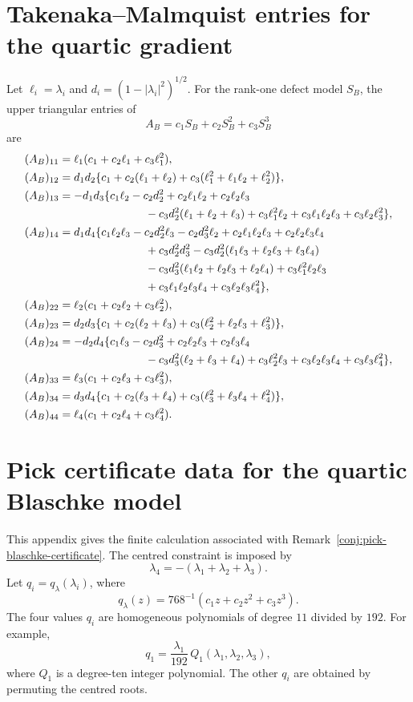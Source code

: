 \documentclass[11pt]{article}
\numberwithin{equation}{section}
\begin{document}
\section{Takenaka--Malmquist entries for the quartic gradient}\label{app:tm-entries}
Let \(\ell_i=\lambda_i\) and \(d_i=(1-|\lambda_i|^2)^{1/2}\).  For the
rank-one defect model \(S_B\), the upper triangular entries of
\[
  A_B=c_1S_B+c_2S_B^2+c_3S_B^3
\]
are
\[
\begin{aligned}
(A_B)_{11}&=\ell_1(c_1+c_2\ell_1+c_3\ell_1^2),\\
(A_B)_{12}&=d_1d_2\{c_1+c_2(\ell_1+\ell_2)
  +c_3(\ell_1^2+\ell_1\ell_2+\ell_2^2)\},\\
(A_B)_{13}&=-d_1d_3\{c_1\ell_2-c_2d_2^2+c_2\ell_1\ell_2+c_2\ell_2\ell_3\\
&\hspace{2.7cm}
-c_3d_2^2(\ell_1+\ell_2+\ell_3)
+c_3\ell_1^2\ell_2+c_3\ell_1\ell_2\ell_3+c_3\ell_2\ell_3^2\},\\
(A_B)_{14}&=d_1d_4\{c_1\ell_2\ell_3-c_2d_2^2\ell_3-c_2d_3^2\ell_2
+c_2\ell_1\ell_2\ell_3+c_2\ell_2\ell_3\ell_4\\
&\hspace{2.7cm}
+c_3d_2^2d_3^2-c_3d_2^2(\ell_1\ell_3+\ell_2\ell_3+\ell_3\ell_4)\\
&\hspace{2.7cm}
-c_3d_3^2(\ell_1\ell_2+\ell_2\ell_3+\ell_2\ell_4)
+c_3\ell_1^2\ell_2\ell_3\\
&\hspace{2.7cm}
+c_3\ell_1\ell_2\ell_3\ell_4+c_3\ell_2\ell_3\ell_4^2\},\\
(A_B)_{22}&=\ell_2(c_1+c_2\ell_2+c_3\ell_2^2),\\
(A_B)_{23}&=d_2d_3\{c_1+c_2(\ell_2+\ell_3)
  +c_3(\ell_2^2+\ell_2\ell_3+\ell_3^2)\},\\
(A_B)_{24}&=-d_2d_4\{c_1\ell_3-c_2d_3^2+c_2\ell_2\ell_3+c_2\ell_3\ell_4\\
&\hspace{2.7cm}
-c_3d_3^2(\ell_2+\ell_3+\ell_4)
+c_3\ell_2^2\ell_3+c_3\ell_2\ell_3\ell_4+c_3\ell_3\ell_4^2\},\\
(A_B)_{33}&=\ell_3(c_1+c_2\ell_3+c_3\ell_3^2),\\
(A_B)_{34}&=d_3d_4\{c_1+c_2(\ell_3+\ell_4)
  +c_3(\ell_3^2+\ell_3\ell_4+\ell_4^2)\},\\
(A_B)_{44}&=\ell_4(c_1+c_2\ell_4+c_3\ell_4^2).
\end{aligned}
\]

\section{Pick certificate data for the quartic Blaschke model}
\label{app:pick-certificate}
This appendix gives the finite calculation associated with
Remark~\ref{conj:pick-blaschke-certificate}.  The centred constraint is imposed by
\[
  \lambda_4=-(\lambda_1+\lambda_2+\lambda_3).
\]
Let \(q_i=q_\lambda(\lambda_i)\), where
\[
  q_\lambda(z)=768^{-1}(c_1z+c_2z^2+c_3z^3).
\]
The four values \(q_i\) are homogeneous polynomials of degree \(11\) divided
by \(192\).
For example,
\[
  q_1=\frac{\lambda_1}{192}\,Q_1(\lambda_1,\lambda_2,\lambda_3),
\]
where \(Q_1\) is a degree-ten integer polynomial.  The other \(q_i\) are
obtained by permuting the centred roots.
\end{document}
